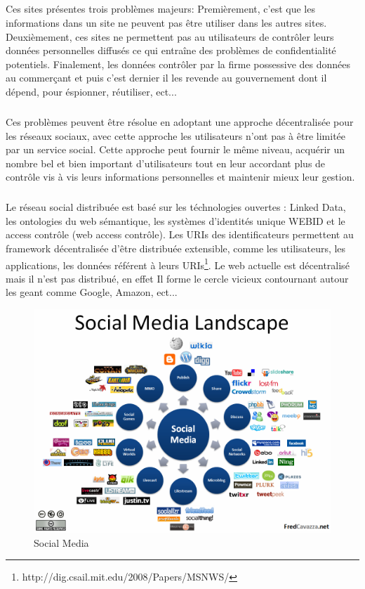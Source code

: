 \subparagraph{}
Ces sites présentes trois problèmes majeurs:
Premièrement, c'est que les informations dans un site ne peuvent pas être utiliser dans les autres sites.
Deuxièmement, ces sites ne permettent pas au utilisateurs de contrôler leurs données personnelles diffusés ce qui entraîne des problèmes de confidentialité potentiels. Finalement, les données contrôler par la firme possessive des données au commerçant et puis c'est dernier il les revende au gouvernement dont il dépend, pour éspionner, réutiliser, ect... 
\subparagraph{}
Ces problèmes peuvent être résolue en adoptant une approche décentralisée pour les réseaux sociaux, avec cette approche les utilisateurs n'ont pas à être limitée par un service social.
Cette approche peut fournir le même niveau, acquérir un nombre bel et bien important d'utilisateurs tout en leur accordant plus de contrôle vis à vis leurs informations personnelles et maintenir mieux leur gestion.
\subparagraph{}
Le réseau social distribuée est basé sur les téchnologies ouvertes : Linked Data, les ontologies du web sémantique, les systèmes d'identités unique WEBID et le access contrôle (web access contrôle).
Les URIs des identificateurs permettent au framework décentralisée d'être distribuée extensible, comme les utilisateurs, les applications, les données référent à leurs URIs\footnote{http://dig.csail.mit.edu/2008/Papers/MSNWS/}.
Le web actuelle est décentralisé mais il n'est pas distribué, en effet Il forme le cercle vicieux contournant autour les geant comme Google, Amazon, ect...
\begin{figure}
                \centering
                \includegraphics[width=\textwidth]{Social-Media-Landscape.png}
                \caption{Social Media}
                \label{fig:Social Media}      
\end{figure}

